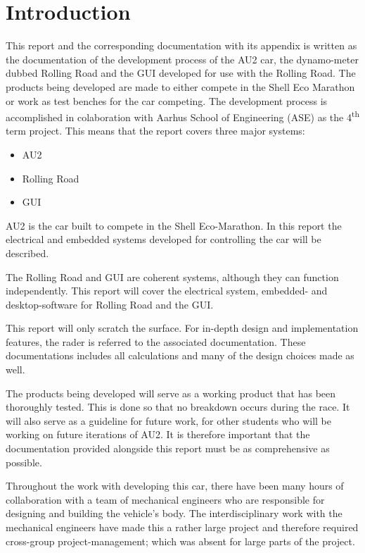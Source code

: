 \chapter{Introduction}
This report and the corresponding documentation with its appendix is written as the documentation of the development process of the AU2 car, the dynamo-meter dubbed Rolling Road and the GUI developed for use with the Rolling Road. The products being developed are made to either compete in the Shell Eco Marathon or work as test benches for the car competing. The development process is accomplished in colaboration with Aarhus School of Engineering (ASE) as the 4\textsuperscript{th} term project. This means that the report covers three major systems:

\begin{itemize}
	\item{AU2}
	\item{Rolling Road}
	\item{GUI}
\end{itemize}

AU2 is the car built to compete in the Shell Eco-Marathon. In this report the electrical and embedded systems developed for controlling the car will be described. 

The Rolling Road and GUI are coherent systems, although they can function independently. This report will cover the electrical system, embedded- and desktop-software for Rolling Road and the GUI. 

This report will only scratch the surface. For in-depth design and implementation features, the rader is referred to the associated documentation. These documentations includes all calculations and many of the design choices made as well.  

The products being developed will serve as a working product that has been thoroughly tested. This is done so that no breakdown occurs during the race. It will also serve as a guideline for future work, for other students who will be working on future iterations of AU2. It is therefore important that the documentation provided alongside this report must be as comprehensive as possible.

Throughout the work with developing this car, there have been many hours of collaboration with a team of mechanical engineers who are responsible for designing and building the vehicle's body. The interdisciplinary work with the mechanical engineers have made this a rather large project and therefore required cross-group project-management; which was absent for large parts of the project. 

